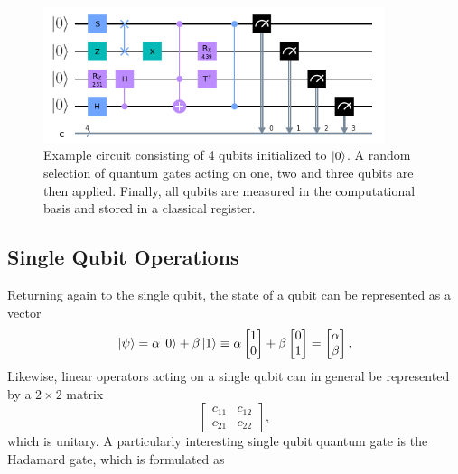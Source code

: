 \begin{figure}[htp]
    \centering
    \includegraphics[width=10cm]{latex/figures/example_circuit.png}
    \caption{Example circuit consisting of 4 qubits initialized to $\ket{0}$. A random selection of quantum gates acting on one, two and three qubits are then applied. Finally, all qubits are measured in the computational basis and stored in a classical register.}
    \label{fig:exampleCircuit}
\end{figure}

\subsection{Single Qubit Operations}\label{sec:ControlledOperations}

Returning again to the single qubit, the state of a qubit can be represented as a vector
\begin{equation}\label{eq:vectorRepresentation}
\ket{\psi} = \alpha \ket{0} + \beta \ket{1} \equiv \alpha 
    \begin{bmatrix}
        1 \\
        0
    \end{bmatrix} + 
    \beta \begin{bmatrix}
        0 \\
        1
    \end{bmatrix}
    =
    \begin{bmatrix}
        \alpha \\
        \beta
    \end{bmatrix}.
\end{equation}
Likewise, linear operators acting on a single qubit can in general be represented by a $2\times 2$ matrix 
\begin{equation}\label{eq:matrixRepresentation}
    \begin{bmatrix}
        c_{11} & c_{12} \\
        c_{21} & c_{22}
    \end{bmatrix},
\end{equation}
which is unitary. A particularly interesting single qubit quantum gate is the Hadamard gate, which is formulated as 

